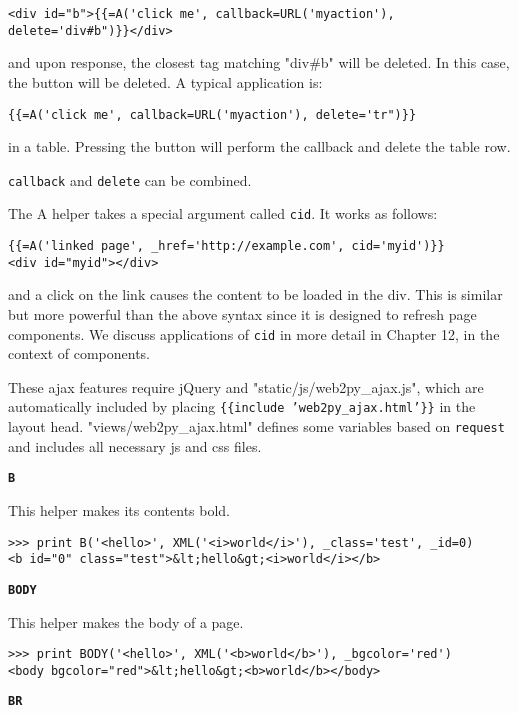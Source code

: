 \documentclass[justified,sixbynine,notoc]{tufte-book}
\def\ft{\small\tt}
\def\inxx#1{\index{#1}}
\begin{document}
\begin{fullwidth}
\begin{lstlisting}[keywords={}]
<div id="b">{{=A('click me', callback=URL('myaction'), delete='div#b")}}</div>
\end{lstlisting}
and upon response, the closest tag matching "div\#b" will be deleted. In this case, the button will be deleted.
A typical application is:

\begin{lstlisting}[keywords={}]
{{=A('click me', callback=URL('myaction'), delete='tr")}}
\end{lstlisting}
\noindent in a table. Pressing the button will perform the callback and delete the table row.

{\ft callback} and {\ft delete} can be combined.

The A helper takes a special argument called {\ft cid}. It works as follows:

\begin{lstlisting}[keywords={}]
{{=A('linked page', _href='http://example.com', cid='myid')}}
<div id="myid"></div>
\end{lstlisting}
\noindent and a click on the link causes the content to be loaded in the div. This is similar but more powerful than the above syntax since it is designed to refresh page components. We discuss applications of {\ft cid} in more detail in Chapter 12, in the context of components.

These ajax features require jQuery and "static/js/web2py\_ajax.js", which are automatically included by placing {\ft \{\{include 'web2py\_ajax.html'\}\}} in the layout head. "views/web2py\_ajax.html" defines some variables based on {\ft request} and includes all necessary js and css files.

{\bf {\ft B}}

\inxx{B}

This helper makes its contents bold.
\begin{lstlisting}
>>> print B('<hello>', XML('<i>world</i>'), _class='test', _id=0)
<b id="0" class="test">&lt;hello&gt;<i>world</i></b>
\end{lstlisting}

{\bf {\ft BODY}}

\inxx{BODY}
This helper makes the body of a page.
\begin{lstlisting}
>>> print BODY('<hello>', XML('<b>world</b>'), _bgcolor='red')
<body bgcolor="red">&lt;hello&gt;<b>world</b></body>
\end{lstlisting}

{\bf {\ft BR}}


\end{fullwidth}
\end{document}
